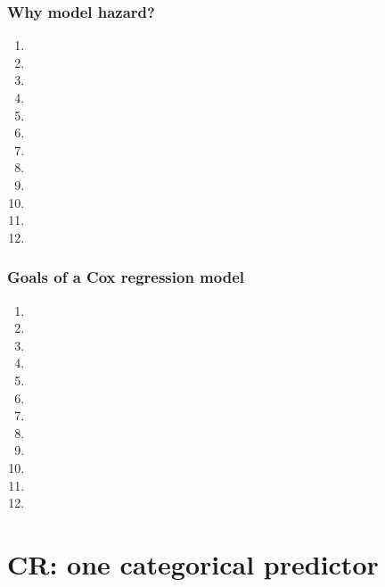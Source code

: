 \begin{frame}
\frametitle{Why model hazard?}
\begin{enumerate}
\item
\item[] %
\item[] %
\item[]
\item %
\item[]
\item[]
\item[]
\item %
\item[]
\item[]
\item[]
\end{enumerate}
\end{frame}


\begin{frame}
\frametitle{Goals of a Cox regression model}
\begin{enumerate}
\item %
\item[]
\item[]
\item[]
\item %
\item[]
\item[]
\item[]
\item %
\item[]
\item[]
\item[]
\end{enumerate}
\end{frame}


\section[CR: one categorical predictor]{CR: one categorical predictor}
